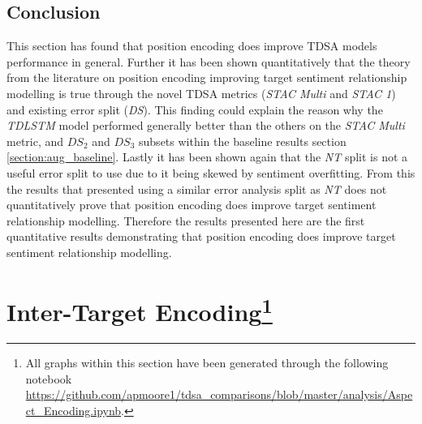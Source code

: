 \subsection{Conclusion}
This section has found that position encoding does improve TDSA models performance in general. Further it has been shown quantitatively that the theory from the literature on position encoding improving target sentiment relationship modelling \citep{li-etal-2018-hierarchical, he-etal-2018-exploiting} is true through the novel TDSA metrics (\textit{STAC Multi} and \textit{STAC 1}) and existing error split (\textit{DS}). This finding could explain the reason why the \textit{TDLSTM} model performed generally better than the others on the \textit{STAC Multi} metric, and $DS_2$ and $DS_3$ subsets within the baseline results section \ref{section:aug_baseline}. Lastly it has been shown again that the \textit{NT} split is not a useful error split to use due to it being skewed by sentiment overfitting. From this the results that \citet{he-etal-2018-exploiting} presented using a similar error analysis split as \textit{NT} does not quantitatively prove that position encoding does improve target sentiment relationship modelling. Therefore the results presented here are the first quantitative results demonstrating that position encoding does improve target sentiment relationship modelling.

\section[Inter-Target Encoding]{Inter-Target Encoding\footnote{All graphs within this section have been generated through the following notebook \url{https://github.com/apmoore1/tdsa_comparisons/blob/master/analysis/Aspect_Encoding.ipynb}.}}
\label{section:aug_inter_target_encoding}
